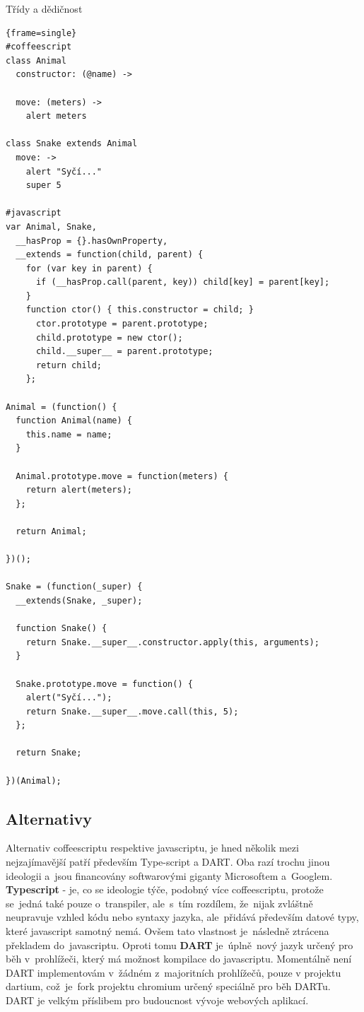 \documentclass[a4paper,12pt,twoside,BCOR=10mm]{article}
\renewcommand{\b}[1]{\textbf{#1}} %
\newenvironment{codeframe}{%
  \begin{Sbox} 
    \begin{minipage} 
      {\columnwidth-\leftmargin-\rightmargin-2\fboxsep-2\fboxrule-4pt} 
}{%

  \end{minipage} 
  \end{Sbox} 
  \begin{center} 
    \fcolorbox{black}{codeback}{\TheSbox} 
  \end{center} 
}
\begin{document}
Třídy a dědičnost
     \begin{codeframe} 
      \begin{Verbatim}{frame=single}
#coffeescript
class Animal
  constructor: (@name) ->

  move: (meters) ->
    alert meters

class Snake extends Animal
  move: ->
    alert "Syčí..."
    super 5

#javascript
var Animal, Snake,
  __hasProp = {}.hasOwnProperty,
  __extends = function(child, parent) { 
    for (var key in parent) { 
      if (__hasProp.call(parent, key)) child[key] = parent[key]; 
    } 
    function ctor() { this.constructor = child; } 
      ctor.prototype = parent.prototype; 
      child.prototype = new ctor(); 
      child.__super__ = parent.prototype; 
      return child; 
    };

Animal = (function() {
  function Animal(name) {
    this.name = name;
  }

  Animal.prototype.move = function(meters) {
    return alert(meters);
  };

  return Animal;

})();

Snake = (function(_super) {
  __extends(Snake, _super);

  function Snake() {
    return Snake.__super__.constructor.apply(this, arguments);
  }

  Snake.prototype.move = function() {
    alert("Syčí...");
    return Snake.__super__.move.call(this, 5);
  };

  return Snake;

})(Animal);

\end{Verbatim} 
    \end{codeframe}

\subsection{Alternativy}
Alternativ coffeescriptu respektive javascriptu, je hned několik mezi nejzajímavější patří především Type-script a DART. Oba razí trochu jinou ideologii a~jsou financovány softwarovými giganty Microsoftem a~Googlem. \b{Typescript} - je, co se ideologie týče, podobný více coffeescriptu, protože se~jedná také pouze o~transpiler, ale~s~tím rozdílem, že~nijak zvláštně neupravuje vzhled kódu nebo syntaxy jazyka, ale~přidává především datové typy, které javascript samotný nemá. Ovšem tato vlastnost je~následně ztrácena překladem do~javascriptu. Oproti tomu \b{DART} je~úplně nový jazyk určený pro běh v~prohlížeči, který má možnost kompilace do javascriptu. Momentálně není DART implementovám v~žádném z~majoritních prohlížečů, pouze v projektu dartium, což~je~fork projektu chromium určený speciálně pro běh DARTu. DART je velkým příslibem pro budoucnost vývoje webových aplikací.
\end{document}

